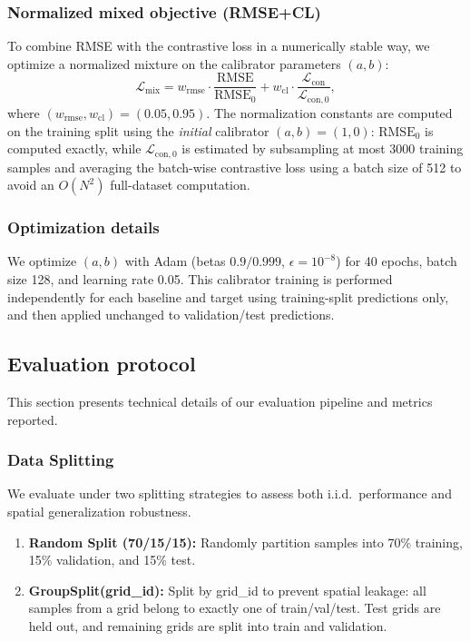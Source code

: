 \documentclass[preprint,12pt]{elsarticle}
\begin{document}
\subsubsection{Normalized mixed objective (RMSE+CL)}
To combine RMSE with the contrastive loss in a numerically stable way, we optimize a normalized mixture on the calibrator parameters $(a,b)$:
\begin{equation}
\mathcal{L}_{\mathrm{mix}}
= w_{\mathrm{rmse}} \cdot \frac{\mathrm{RMSE}}{\mathrm{RMSE}_0}
+ w_{\mathrm{cl}}\cdot \frac{\mathcal{L}_{\mathrm{con}}}{\mathcal{L}_{\mathrm{con},0}},
\end{equation}
where $(w_{\mathrm{rmse}},w_{\mathrm{cl}})=(0.05,0.95)$. The normalization constants are computed on the training split using the \emph{initial} calibrator $(a,b)=(1,0)$: $\mathrm{RMSE}_0$ is computed exactly, while $\mathcal{L}_{\mathrm{con},0}$ is estimated by subsampling at most 3000 training samples and averaging the batch-wise contrastive loss using a batch size of 512 to avoid an $O(N^2)$ full-dataset computation.

\subsubsection{Optimization details}
We optimize $(a,b)$ with Adam (betas $0.9/0.999$, $\epsilon=10^{-8}$) for 40 epochs, batch size 128, and learning rate 0.05. This calibrator training is performed independently for each baseline and target using training-split predictions only, and then applied unchanged to validation/test predictions.

\subsection{Evaluation protocol}

This section presents technical details of our evaluation pipeline and metrics reported.

\label{sec:eval_protocol}

\subsubsection{Data Splitting}
\label{sec:data_splitting}

We evaluate under two splitting strategies to assess both i.i.d.\ performance and spatial generalization robustness.
\begin{enumerate}
    \item \textbf{Random Split (70/15/15):} Randomly partition samples into 70\% training, 15\% validation, and 15\% test.
    \item \textbf{GroupSplit(grid\_id):} Split by grid\_id to prevent spatial leakage: all samples from a grid belong to exactly one of train/val/test. Test grids are held out, and remaining grids are split into train and validation.
\end{enumerate}
\end{document}
